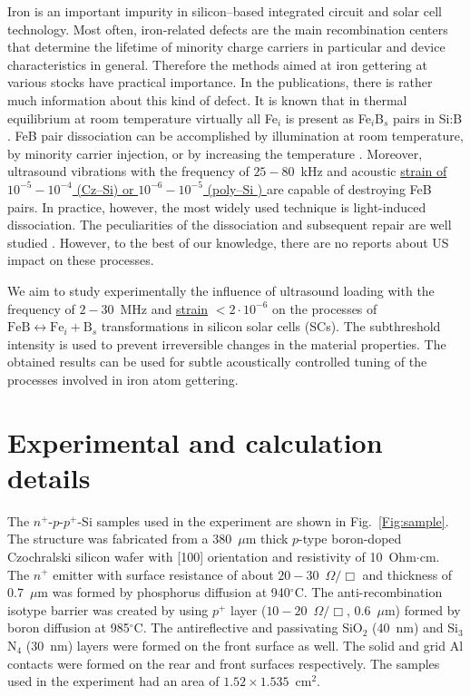 \documentclass[%
 aip,jap,
 amsmath,amssymb,
 reprint,%
]{revtex4-1}
\begin{document}
Iron is an important impurity in silicon--based integrated circuit and solar cell technology.
Most often, iron-related defects are the main recombination centers that determine the lifetime of  minority charge carriers in particular and device characteristics in general.
Therefore the methods aimed at iron gettering at various stocks have practical importance.
In the publications, there is rather much information about this kind of defect.
It is known that in thermal equilibrium at room temperature virtually all Fe$_i$ is present as Fe$_i$B$_s$ pairs in Si:B \cite{FeBLight2,FeBJAP2005}.
FeB pair dissociation can be accomplished by illumination at room temperature, by minority carrier injection, or by increasing the temperature \cite{FeBLight2,FeBAssJAP2014,FeB_Zong}.
Moreover, ultrasound  vibrations with the frequency of $25-80$~kHz and acoustic
\textcolor[rgb]{0.00,0.07,1.00}{\uline{
strain of $10^{-5}-10^{-4}$ (Cz--Si\cite{Ostapenko1995})
or $10^{-6}-10^{-5}$ (poly--Si \cite{Ostapenko1995SST,Ostapenko1994APL})
}}
are capable of destroying FeB pairs.
In practice, however, the most widely used technique is light-induced dissociation.
The peculiarities of the dissociation and subsequent repair are well studied \cite{FeBLight2,FeBKin2019,FeBAssJAP2014,FeBJAP2005,FeBAssSST2011,lauer2016,FeBStrongIll,FeBkinAPL2008,FeBKinAPL2013}. However, to the best of our knowledge, there are no reports about US impact on these processes.

We aim  to study experimentally the influence of ultrasound loading with the
frequency of $2-30$~MHz and  \textcolor[rgb]{0.00,0.07,1.00}{\uline{strain}} $<2\cdot10^{-6}$ on the
processes of $\mathrm{FeB}\leftrightarrow\mathrm{Fe}_i+\mathrm{B}_s$ transformations in silicon solar cells (SCs).
The subthreshold intensity is used to prevent irreversible changes in the material properties.
The obtained results can be used for subtle acoustically controlled tuning of the processes involved in iron atom gettering.

\section{\label{sec:Exp}Experimental and calculation details}


The $n^+$-$p$-$p^+$-Si samples used in the experiment are shown in Fig.~\ref{Fig:sample}.
The structure was fabricated from a 380~$\mu$m thick $p$-type boron-doped
Czochralski silicon wafer with [100] orientation and resistivity of 10~Ohm$\cdot$cm.
The $n^+$ emitter with surface resistance of about $20-30$~$\Omega/\Box$
and  thickness of $0.7$~$\mu$m was formed by phosphorus diffusion at 940$^\circ$C.
The anti-recombination isotype barrier was created by using $p^+$
layer ($10-20$~$\Omega/\Box$, $0.6$~$\mu$m) formed by boron diffusion at 985$^\circ$C.
The antireflective and passivating SiO$_2$ (40~nm) and Si$_3$N$_4$ (30~nm) layers
were formed on the front surface as well.
The solid and grid Al contacts were formed on the rear and front surfaces respectively.
The samples used in the experiment had an area of $1.52\times1.535$~cm$^2$.
\end{document}
